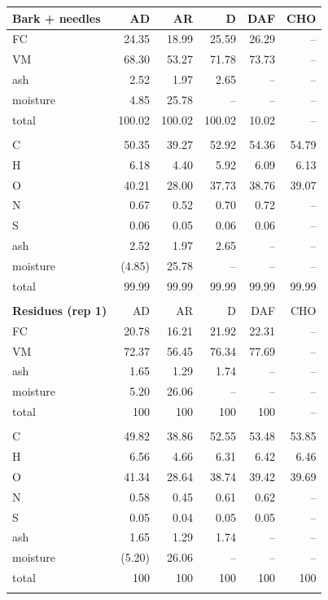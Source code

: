 \begin{longtable}{lrrrrr}
    \textbf{Bark + needles} & AD & AR & D & DAF & CHO \\
    \midrule
    FC       & 24.35  & 18.99  & 25.59  & 26.29  & -- \\
    VM       & 68.30  & 53.27  & 71.78  & 73.73  & -- \\
    ash      & 2.52   & 1.97   & 2.65   & --     & -- \\
    moisture & 4.85   & 25.78  & --     & --     & -- \\
    total    & 100.02 & 100.02 & 100.02 & 10.02  & -- \\
    \\
    C        & 50.35  & 39.27  & 52.92  & 54.36  & 54.79 \\
    H        & 6.18   & 4.40   & 5.92   & 6.09   & 6.13 \\
    O        & 40.21  & 28.00  & 37.73  & 38.76  & 39.07 \\
    N        & 0.67   & 0.52   & 0.70   & 0.72   & -- \\
    S        & 0.06   & 0.05   & 0.06   & 0.06   & -- \\
    ash      & 2.52   & 1.97   & 2.65   & --     & -- \\
    moisture & (4.85) & 25.78  & --     & --     & -- \\
    total    & 99.99  & 99.99  & 99.99  & 99.99  & 99.99 \\
    \\

    \textbf{Residues (rep 1)} & AD & AR & D & DAF & CHO \\
    \midrule
    FC       & 20.78  & 16.21  & 21.92  & 22.31  & -- \\
    VM       & 72.37  & 56.45  & 76.34  & 77.69  & -- \\
    ash      & 1.65   & 1.29   & 1.74   & --     & -- \\
    moisture & 5.20   & 26.06  & --     & --     & -- \\
    total    & 100    & 100    & 100    & 100    & -- \\
    \\
    C        & 49.82  & 38.86  & 52.55  & 53.48  & 53.85 \\
    H        & 6.56   & 4.66   & 6.31   & 6.42   & 6.46 \\
    O        & 41.34  & 28.64  & 38.74  & 39.42  & 39.69 \\
    N        & 0.58   & 0.45   & 0.61   & 0.62   & -- \\
    S        & 0.05   & 0.04   & 0.05   & 0.05   & -- \\
    ash      & 1.65   & 1.29   & 1.74   & --     & -- \\
    moisture & (5.20) & 26.06  & --     & --     & -- \\
    total    & 100    & 100    & 100    & 100    & 100 \\
    \\


\end{longtable}
